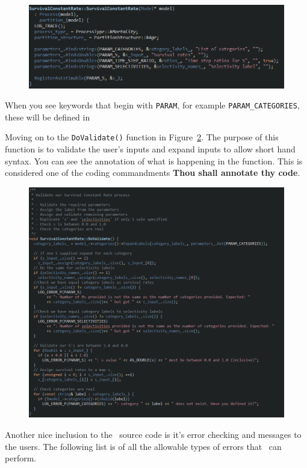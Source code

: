 \begin{figure}[!ht]
	\centering
	\includegraphics[scale=0.8]{Figures/constructor.png}
	\caption{}\label{fig:constructor}
\end{figure}
When you see keywords that begin with \texttt{PARAM}, for example \texttt{PARAM\_CATEGORIES}, these will be defined in 

Moving on to the \texttt{DoValidate()} function in Figure~\ref{fig:validate}. The purpose of this function is to validate the user's inputs and expand inputs to allow short hand syntax. You can see the annotation of what is happening in the function. This is considered one of the coding commandments \textbf{Thou shall annotate thy code}.
\begin{figure}[!ht]
	\centering
	\includegraphics[scale=0.7]{Figures/validate.png}
	\caption{}\label{fig:validate}
\end{figure}

Another nice inclusion to the \CNAME\ source code is it's error checking and messages to the users. The following list is of all the allowable types of errors that \CNAME\ can perform.

